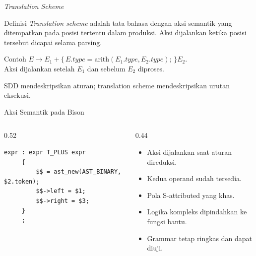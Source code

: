 \documentclass[aspectratio=169,10pt,t]{beamer}
\begin{document}
\begin{frame}{\textit{Translation Scheme}}
  \begin{block}{Definisi}
    \small
    \textit{Translation scheme} adalah tata bahasa dengan aksi
    semantik yang ditempatkan pada posisi tertentu dalam produksi.
    Aksi dijalankan ketika posisi tersebut dicapai selama parsing.
  \end{block}

  \begin{exampleblock}{Contoh}
    \footnotesize
    \(E \to E_1+\{\,E.type=\text{arith}(E_1.type,E_2.type);\,\}E_2\).\\
    Aksi dijalankan setelah \(E_1\) dan sebelum \(E_2\) diproses.
  \end{exampleblock}

  \vspace{2pt}
  {\footnotesize SDD mendeskripsikan aturan; translation scheme
  mendeskripsikan urutan eksekusi.}
\end{frame}

\begin{frame}[fragile]{Aksi Semantik pada Bison}
  \begin{columns}[T,onlytextwidth]
    \begin{column}{0.52\textwidth}
      \begin{lstlisting}[language=Bison,numbers=none,
        caption={Translation scheme pada Bison}]
expr : expr T_PLUS expr
     {
         $$ = ast_new(AST_BINARY, $2.token);
         $$->left = $1;
         $$->right = $3;
     }
     ;
      \end{lstlisting}
    \end{column}
    \begin{column}{0.44\textwidth}
      \begin{itemize}
        \item Aksi dijalankan saat aturan direduksi.
        \item Kedua operand sudah tersedia.
        \item Pola S-attributed yang khas.
        \item Logika kompleks dipindahkan ke fungsi bantu.
        \item Grammar tetap ringkas dan dapat diuji.
      \end{itemize}
    \end{column}
  \end{columns}
\end{frame}
\end{document}
